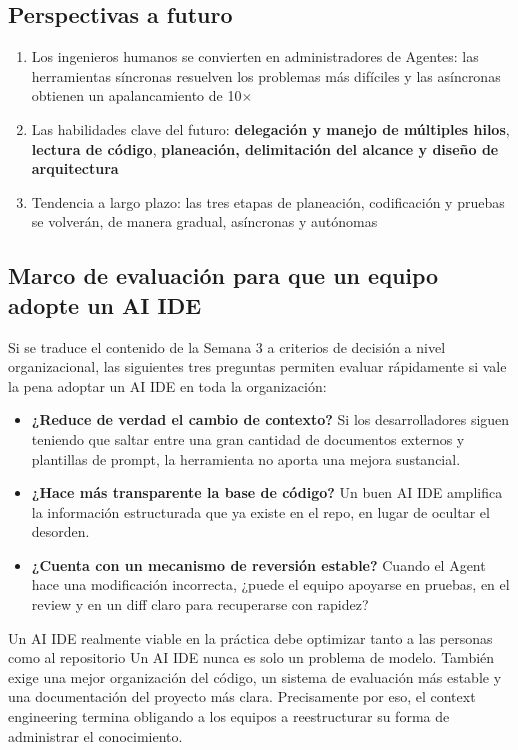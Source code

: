 \documentclass[a4paper]{article}
\begin{document}
\subsection{Perspectivas a futuro}

\begin{enumerate}
    \item Los ingenieros humanos se convierten en administradores de Agentes: las herramientas síncronas resuelven los problemas más difíciles y las asíncronas obtienen un apalancamiento de 10$\times$
    \item Las habilidades clave del futuro: \textbf{delegación y manejo de múltiples hilos}, \textbf{lectura de código}, \textbf{planeación, delimitación del alcance y diseño de arquitectura}
    \item Tendencia a largo plazo: las tres etapas de planeación, codificación y pruebas se volverán, de manera gradual, asíncronas y autónomas
\end{enumerate}

\subsection{Marco de evaluación para que un equipo adopte un AI IDE}

Si se traduce el contenido de la Semana 3 a criterios de decisión a nivel organizacional, las siguientes tres preguntas permiten evaluar rápidamente si vale la pena adoptar un AI IDE en toda la organización:

\begin{itemize}
    \item \textbf{¿Reduce de verdad el cambio de contexto?} Si los desarrolladores siguen teniendo que saltar entre una gran cantidad de documentos externos y plantillas de prompt, la herramienta no aporta una mejora sustancial.
    \item \textbf{¿Hace más transparente la base de código?} Un buen AI IDE amplifica la información estructurada que ya existe en el repo, en lugar de ocultar el desorden.
    \item \textbf{¿Cuenta con un mecanismo de reversión estable?} Cuando el Agent hace una modificación incorrecta, ¿puede el equipo apoyarse en pruebas, en el review y en un diff claro para recuperarse con rapidez?
\end{itemize}

\begin{knowledgebox}{Un AI IDE realmente viable en la práctica debe optimizar tanto a las personas como al repositorio}
Un AI IDE nunca es solo un problema de modelo. También exige una mejor organización del código, un sistema de evaluación más estable y una documentación del proyecto más clara. Precisamente por eso, el context engineering termina obligando a los equipos a reestructurar su forma de administrar el conocimiento.
\end{knowledgebox}
\end{document}
